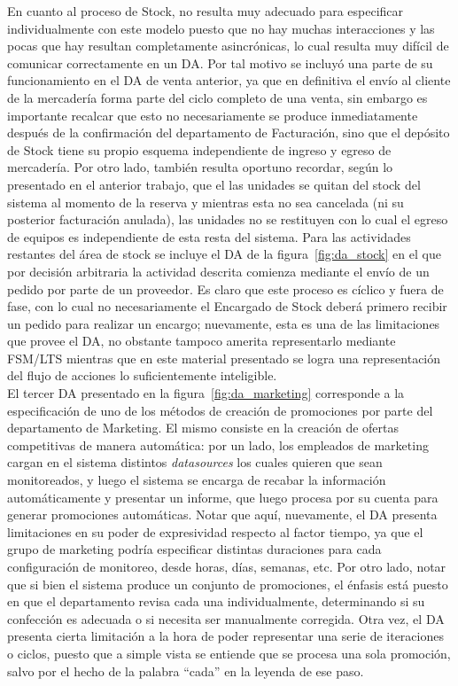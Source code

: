 \indent En cuanto al proceso de Stock, no resulta muy adecuado para especificar individualmente con este modelo puesto que no hay muchas interacciones y las pocas que hay resultan completamente asincrónicas, lo cual resulta muy difícil de comunicar correctamente en un DA. Por tal motivo se incluyó una parte de su funcionamiento en el DA de venta anterior, ya que en definitiva el envío al cliente de la mercadería forma parte del ciclo completo de una venta, sin embargo es importante recalcar que esto no necesariamente se produce inmediatamente después de la confirmación del departamento de Facturación, sino que el depósito de Stock tiene su propio esquema independiente de ingreso y egreso de mercadería. Por otro lado, también resulta oportuno recordar, según lo presentado en el anterior trabajo, que el las unidades se quitan del stock del sistema al momento de la reserva y mientras esta no sea cancelada (ni su posterior facturación anulada), las unidades no se restituyen con lo cual el egreso de equipos es independiente de esta resta del sistema. Para las actividades restantes del área de stock se incluye el DA de la figura~\ref{fig:da_stock} en el que por decisión arbitraria la actividad descrita comienza mediante el envío de un pedido por parte de un proveedor. Es claro que este proceso es cíclico y fuera de fase, con lo cual no necesariamente el Encargado de Stock deberá primero recibir un pedido para realizar un encargo; nuevamente, esta es una de las limitaciones que provee el DA, no obstante tampoco amerita representarlo mediante FSM/LTS mientras que en este material presentado se logra una representación del flujo de acciones lo suficientemente inteligible.\\
\indent El tercer DA presentado en la figura~\ref{fig:da_marketing} corresponde a la especificación de uno de los métodos de creación de promociones por parte del departamento de Marketing. El mismo consiste en la creación de ofertas competitivas de manera automática: por un lado, los empleados de marketing cargan en el sistema distintos \textsl{datasources} los cuales quieren que sean monitoreados, y luego el sistema se encarga de recabar la información automáticamente y presentar un informe, que luego procesa por su cuenta para generar promociones automáticas. Notar que aquí, nuevamente, el DA presenta limitaciones en su poder de expresividad respecto al factor tiempo, ya que el grupo de marketing podría especificar distintas duraciones para cada configuración de monitoreo, desde horas, días, semanas, etc. Por otro lado, notar que si bien el sistema produce un conjunto de promociones, el énfasis está puesto en que el departamento revisa cada una individualmente, determinando si su confección es adecuada o si necesita ser manualmente corregida. Otra vez, el DA presenta cierta limitación a la hora de poder representar una serie de iteraciones o ciclos, puesto que a simple vista se entiende que se procesa una sola promoción, salvo por el hecho de la palabra ``cada'' en la leyenda de ese paso.\\

